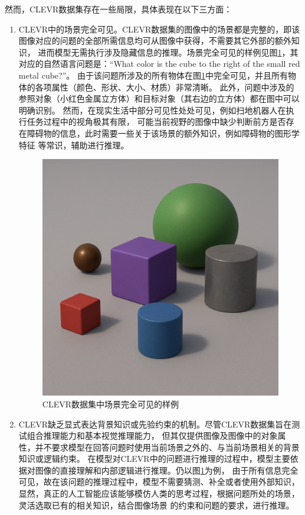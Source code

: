 然而，CLEVR数据集存在一些局限，具体表现在以下三方面：
\begin{enumerate}[nosep]
\item CLEVR中的场景完全可见。CLEVR数据集的图像中的场景都是完整的，即该图像对应的问题的全部所需信息均可从图像中获得，不需要其它外部的额外知识，
进而模型无需执行涉及隐藏信息的推理。场景完全可见的样例见图\ref{observable}，其对应的自然语言问题是：“What color is the cube to the right of the small red metal cube?”。
由于该问题所涉及的所有物体在图\ref{observable}中完全可见，并且所有物体的各项属性（颜色、形状、大小、材质）非常清晰。
此外，问题中涉及的参照对象（小红色金属立方体）和目标对象（其右边的立方体）都在图中可以明确识别。
然而，在现实生活中部分可见性处处可见，例如扫地机器人在执行任务过程中的视角极其有限，
可能当前视野的图像中缺少判断前方是否存在障碍物的信息，此时需要一些关于该场景的额外知识，例如障碍物的图形学特征
等常识，辅助进行推理。
\begin{figure}[h]
    \centering
    \includegraphics[scale=0.2]{figures/observable.png}
    \caption{CLEVR数据集中场景完全可见的样例}
    \label{observable}
\end{figure}
\item CLEVR缺乏显式表达背景知识或先验约束的机制。尽管CLEVR数据集旨在测试组合推理能力和基本视觉推理能力，
但其仅提供图像及图像中的对象属性，并不要求模型在回答问题时使用当前场景之外的、与当前场景相关的背景知识或逻辑约束。
在模型对CLEVR中的问题进行推理的过程中，模型主要依据对图像的直接理解和内部逻辑进行推理。仍以图\ref{observable}为例，
由于所有信息完全可见，故在该问题的推理过程中，模型不需要猜测、补全或者使用外部知识，
显然，真正的人工智能应该能够模仿人类的思考过程，根据问题所处的场景，灵活选取已有的相关知识，结合图像场景
的约束和问题的要求，进行推理。
\end{enumerate}
